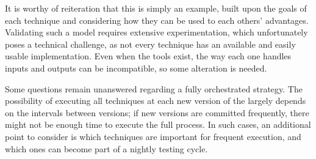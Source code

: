 It is worthy of reiteration that this is simply an example, built upon the goals of each \rt technique and considering how they can be used to each others' advantages.
Validating such a model requires extensive experimentation, which unfortunately poses a technical challenge, as not every technique has an available and easily usable implementation.
Even when the tools exist, the way each one handles inputs and outputs can be incompatible, so some alteration is needed.

Some questions remain unanswered regarding a fully orchestrated strategy.
The possibility of executing all \rt techniques at each new version of the \sut largely depends on the intervals between versions; if new versions are committed frequently, there might not be enough time to execute the full process.
In such cases, an additional point to consider is which techniques are important for frequent execution, and which ones can become part of a nightly testing cycle.

